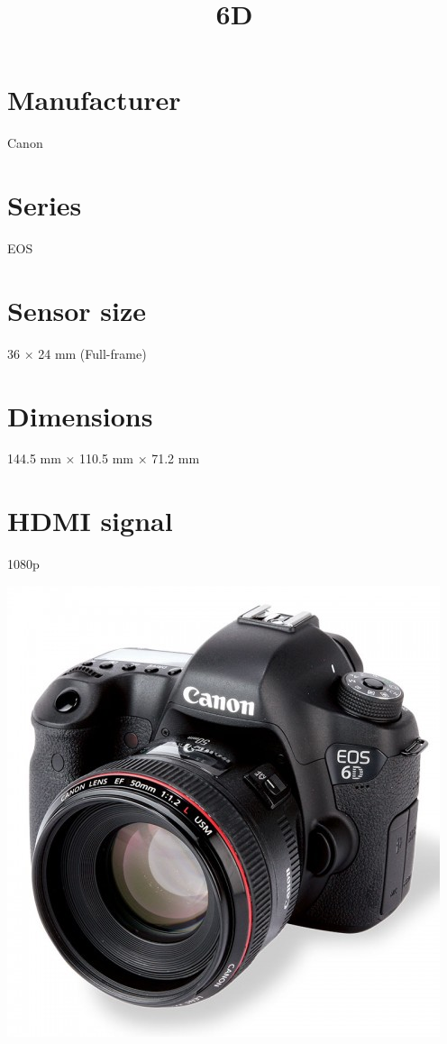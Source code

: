 \documentclass{article}
\begin{document}
\usepackage{titlesec}
\usepackage{graphicx}


\title{6D}
\section{Manufacturer}
Canon
\section{Series}
EOS
\section{Sensor size}
36 × 24 mm (Full-frame)
\section{Dimensions}
144.5 mm × 110.5 mm × 71.2 mm
\section{HDMI signal}
1080p


\includegraphics[width=\textwidth]{6d.jpg}
\end{document}
